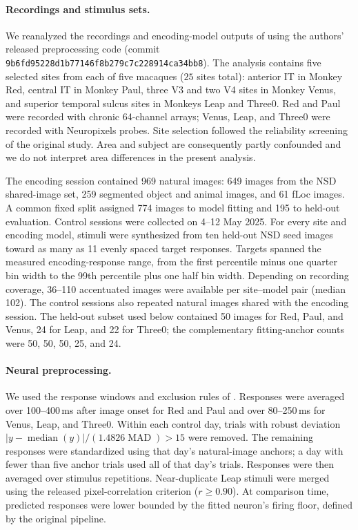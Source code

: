 \paragraph{Recordings and stimulus sets.}
We reanalyzed the recordings and encoding-model outputs of \citetPW using the
authors' released preprocessing code (commit
\texttt{9b6fd95228d1b77146f8b279c7c228914ca34bb8}).  The analysis contains five
selected sites from each of five macaques ($25$ sites total): anterior IT in
Monkey Red, central IT in Monkey Paul, three V3 and two V4 sites in Monkey
Venus, and superior temporal sulcus sites in Monkeys Leap and Three0.  Red and
Paul were recorded with chronic 64-channel arrays; Venus, Leap, and Three0
were recorded with Neuropixels probes.  Site selection followed the reliability
screening of the original study.  Area and subject are consequently partly
confounded and we do not interpret area differences in the present analysis.

The encoding session contained 969 natural images: 649 images from the NSD
shared-image set, 259 segmented object and animal images, and 61 fLoc images.
A common fixed split assigned 774 images to model fitting and 195 to held-out
evaluation.  Control sessions were collected on 4--12 May 2025.  For every
site and encoding model, stimuli were synthesized from ten held-out NSD seed
images toward as many as 11 evenly spaced target responses.  Targets spanned
the measured encoding-response range, from the first percentile minus one
quarter bin width to the 99th percentile plus one half bin width.  Depending
on recording coverage, 36--110 accentuated images were available per
site--model pair (median 102).  The control sessions also repeated natural
images shared with the encoding session.  The held-out subset used below
contained 50 images for Red, Paul, and Venus, 24 for Leap, and 22 for Three0;
the complementary fitting-anchor counts were 50, 50, 50, 25, and 24.

\paragraph{Neural preprocessing.}
We used the response windows and exclusion rules of \citetPW.  Responses were
averaged over 100--400\,ms after image onset for Red and Paul and over
80--250\,ms for Venus, Leap, and Three0.  Within each control day, trials with
robust deviation $|y-\operatorname{median}(y)|/(1.4826\operatorname{MAD})>15$
were removed.  The remaining responses were standardized using that day's
natural-image anchors; a day with fewer than five anchor trials used all of
that day's trials.  Responses were then averaged over stimulus repetitions.
Near-duplicate Leap stimuli were merged using the released pixel-correlation
criterion ($r\geq0.90$).  At comparison time, predicted responses were lower
bounded by the fitted neuron's firing floor, defined by the original pipeline.

